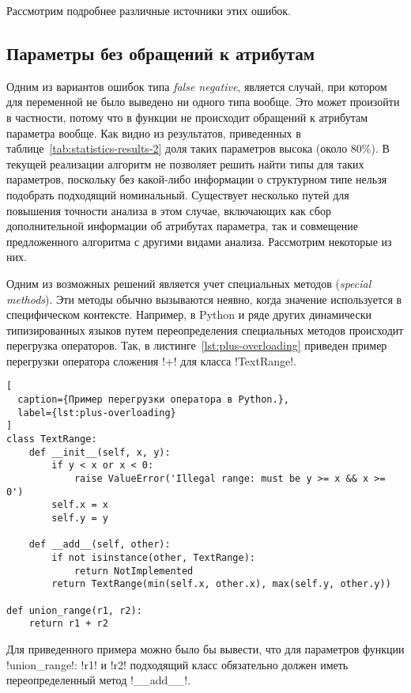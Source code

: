 Рассмотрим подробнее различные источники этих ошибок.

\subsection{Параметры без обращений к атрибутам}
\label{sub:attributeless-parameters}

Одним из вариантов ошибок типа \emph{false negative}, является случай, при котором для
переменной не было выведено ни одного типа вообще. Это может произойти в
частности, потому что в функции не происходит обращений к атрибутам параметра
вообще. Как видно из результатов, приведенных в
таблице~\ref{tab:statistics-results-2} доля таких параметров высока (около
80\%). В текущей реализации алгоритм не позволяет решить найти типы для таких
параметров, поскольку без какой-либо информации о структурном типе нельзя
подобрать подходящий номинальный. Существует несколько путей для повышения
точности анализа в этом случае, включающих как сбор дополнительной информации об
атрибутах параметра, так и совмещение предложенного алгоритма с другими видами
анализа. Рассмотрим некоторые из них.

Одним из возможных решений является учет специальных методов (\emph{special
 methods}). Эти методы обычно вызываются неявно, когда значение используется в
специфическом контексте. Например, в Python и ряде других динамически
типизированных языков путем переопределения специальных методов происходит
перегрузка операторов.  Так, в листинге~\ref{lst:plus-overloading} приведен
 пример перегрузки оператора сложения !+! для класса !TextRange!.

\begin{lstlisting}[
  caption={Пример перегрузки оператора в Python.},
  label={lst:plus-overloading}
]
class TextRange:
    def __init__(self, x, y):
        if y < x or x < 0:
            raise ValueError('Illegal range: must be y >= x && x >= 0')
        self.x = x
        self.y = y

    def __add__(self, other):
        if not isinstance(other, TextRange):
            return NotImplemented
        return TextRange(min(self.x, other.x), max(self.y, other.y))

def union_range(r1, r2):
    return r1 + r2    

\end{lstlisting}

Для приведенного примера можно было бы вывести, что для параметров функции
!union_range!: !r1! и !r2! подходящий класс обязательно должен иметь
переопределенный метод !__add__!. 

